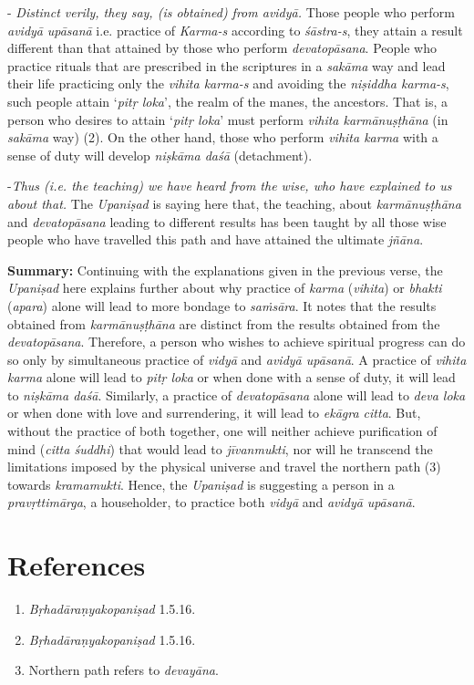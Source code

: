  - \emph{Distinct verily, they say, (is obtained) from avidyā.} Those people who perform \emph{avidyā} \emph{upāsanā} i.e. practice of \emph{Karma-s} according to \emph{śāstra-s}, they attain a result different than that attained by those who perform \emph{devatopāsana}. People who practice rituals that are prescribed in the scriptures in a \emph{sakāma} way and lead their life practicing only the \emph{vihita karma-s} and avoiding the \emph{niṣiddha karma-s}, such people attain `\emph{pitṛ loka}', the realm of the manes, the ancestors. That is, a person who desires to attain `\emph{pitṛ loka}' must perform \emph{vihita karmānuṣṭhāna} (in \emph{sakāma} way) (2). On the other hand, those who perform \emph{vihita karma} with a sense of duty will develop \emph{niṣkāma daśā} (detachment).

-\emph{Thus (i.e. the teaching) we have heard from the wise, who have explained to us about that.} The \emph{Upaniṣad} is saying here that, the teaching, about \emph{karmānuṣṭhāna} and \emph{devatopāsana} leading to different results has been taught by all those wise people who have travelled this path and have attained the ultimate \emph{jñāna}.

\textbf{Summary:} Continuing with the explanations given in the previous verse, the \emph{Upaniṣad} here explains further about why practice of \emph{karma} (\emph{vihita}) or \emph{bhakti} (\emph{apara}) alone will lead to more bondage to \emph{saṁsāra}. It notes that the results obtained from \emph{karmānuṣṭhāna} are distinct from the results obtained from the \emph{devatopāsana}. Therefore, a person who wishes to achieve spiritual progress can do so only by simultaneous practice of \emph{vidyā} and \emph{avidyā upāsanā}. A practice of \emph{vihita karma} alone will lead to \emph{pitṛ loka} or when done with a sense of duty, it will lead to \emph{niṣkāma daśā}. Similarly, a practice of \emph{devatopāsana} alone will lead to \emph{deva loka} or when done with love and surrendering, it will lead to \emph{ekāgra citta}. But, without the practice of both together, one will neither achieve purification of mind (\emph{citta śuddhi}) that would lead to \emph{jīvanmukti}, nor will he transcend the limitations imposed by the physical universe and travel the northern path (3) towards \emph{kramamukti}. Hence, the \emph{Upaniṣad} is suggesting a person in a \emph{pravṛttimārga}, a householder, to practice both \emph{vidyā} and \emph{avidyā} \emph{upāsanā}.

\section*{References}

\begin{enumerate}
\itemsep=0pt
\item
  \emph{Bṛhadāraṇyakopaniṣad} 1.5.16.
\item
  \emph{Bṛhadāraṇyakopaniṣad} 1.5.16.
\item
  Northern path refers to \emph{devayāna}.
\end{enumerate}



